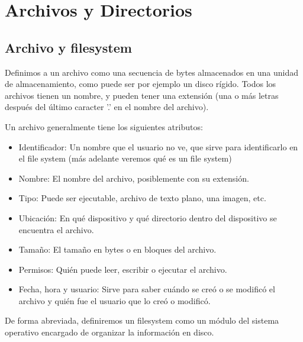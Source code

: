 \documentclass{article}
\begin{document}
\section{Archivos y Directorios}

\subsection{Archivo y filesystem}

Definimos a un archivo como una secuencia de bytes almacenados en una unidad de almacenamiento, como puede ser por ejemplo un disco r\'igido. Todos los archivos tienen un nombre, y pueden tener una extensi\'on (una o m\'as letras despu\'es del \'ultimo caracter '.' en el nombre del archivo).

Un archivo generalmente tiene los siguientes atributos:

\begin{itemize}
\item Identificador: Un nombre que el usuario no ve, que sirve para identificarlo en el file system (m\'as adelante veremos qu\'e es un file system)
\item Nombre: El nombre del archivo, posiblemente con su extensi\'on.
\item Tipo: Puede ser ejecutable, archivo de texto plano, una imagen, etc.
\item Ubicaci\'on: En qu\'e dispositivo y qu\'e directorio dentro del dispositivo se encuentra el archivo.
\item Tama\~no: El tama\~no en bytes o en bloques del archivo.
\item Permisos: Qui\'en puede leer, escribir o ejecutar el archivo.
\item Fecha, hora y usuario: Sirve para saber cu\'ando se cre\'o o se modific\'o el archivo y qui\'en fue el usuario que lo cre\'o o modific\'o.
\end{itemize}

De forma abreviada, definiremos un filesystem como un módulo del sistema operativo encargado de organizar la información en disco.
\end{document}
